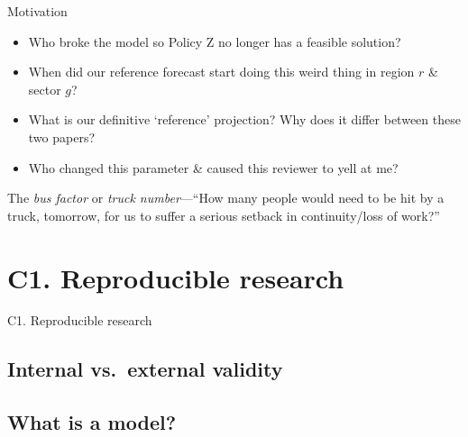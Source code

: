 \documentclass[12pt,aspectratio=169]{beamer}
\begin{document}
\begin{frame}{Motivation}

  \begin{itemize}
    \item Who broke the model so Policy Z no longer has a feasible solution?
    \item When did our reference forecast start doing this weird thing in region $r$ \& sector $g$?
    \item What is our definitive ‘reference’ projection?
          Why does it differ between these two papers?
    \item Who changed this parameter \& caused this reviewer to yell at me?
  \end{itemize}

  \bigskip

  The \emph{bus factor} or \emph{truck number}—“How many people would need to be hit by a truck, tomorrow, for us to suffer a serious setback in continuity/loss of work?”

\end{frame}

\section{C1. Reproducible research}
\begin{frame}{C1. Reproducible research}
  \tableofcontents[hideothersubsections]
\end{frame}

\subsection{Internal vs.\ external validity}


\subsection{What is a model?}

\end{document}
